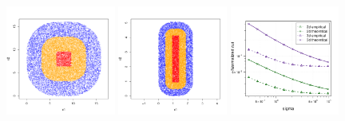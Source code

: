 \documentclass[11pt,twoside]{article}
\newcommand{\1}{\mathbf{1}}
\begin{document}
\begin{figure}[tb]
  \centering
  \includegraphics[width=0.32\textwidth]{example1plots/sample2}
  \includegraphics[width=0.32\textwidth]{example1plots/sample1}
  \includegraphics[width=0.32\textwidth]{example1plots/sigma_normalized_cut_plot}
  

\end{figure}
\end{document}
